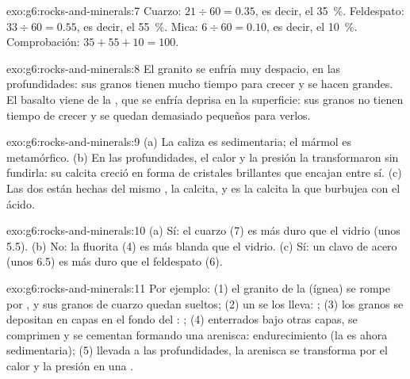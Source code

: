 \begin{solution}{exo:g6:rocks-and-minerals:7}
Cuarzo: $21 \div 60 = 0.35$, es decir, el 35~\%. Feldespato:
$33 \div 60 = 0.55$, es decir, el 55~\%. Mica: $6 \div 60 = 0.10$, es
decir, el 10~\%. Comprobación: $35 + 55 + 10 = 100$.
\end{solution}

\begin{solution}{exo:g6:rocks-and-minerals:8}
El granito se enfría muy despacio, en las profundidades: sus granos tienen
mucho tiempo para crecer y se hacen grandes. El basalto viene de la ,
que se enfría deprisa en la superficie: sus granos no tienen tiempo de
crecer y se quedan demasiado pequeños para verlos.
\end{solution}

\begin{solution}{exo:g6:rocks-and-minerals:9}
(a) La caliza es sedimentaria; el mármol es metamórfico. (b) En las
profundidades, el calor y la presión la transformaron sin fundirla: su
calcita creció en forma de cristales brillantes que encajan entre sí.
(c) Las dos están hechas del mismo , la calcita, y es la calcita la
que burbujea con el ácido.
\end{solution}

\begin{solution}{exo:g6:rocks-and-minerals:10}
(a) Sí: el cuarzo (7) es más duro que el vidrio (unos 5.5). (b) No: la
fluorita (4) es más blanda que el vidrio. (c) Sí: un clavo de acero (unos
6.5) es más duro que el feldespato (6).
\end{solution}

\begin{solution}{exo:g6:rocks-and-minerals:11}
Por ejemplo: (1) el granito de la  (ígnea) se rompe por
, y sus granos de cuarzo quedan sueltos; (2) un  se los
lleva: ; (3) los granos se depositan en capas en el fondo del :
; (4) enterrados bajo otras capas, se comprimen y se cementan
formando una arenisca: endurecimiento (la  es ahora sedimentaria);
(5) llevada a las profundidades, la arenisca se transforma por el calor y
la presión en una .
\end{solution}

